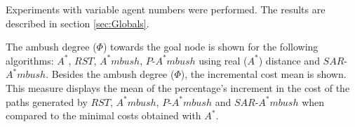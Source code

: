 Experiments with variable agent numbers were performed.
The results are described in section \ref{sec:Globals}. 

The ambush degree ($\Phi$) towards the goal node is shown for the 
following algorithms: $A^*$, $RST$, $A^*mbush$, $P$-$A^*mbush$ 
using real ($A^*$) distance and $SAR$-$A^*mbush$.
Besides the ambush degree ($\Phi$), the incremental cost mean is 
shown. This measure displays the mean of  the percentage's increment
in the cost of the paths generated by $RST$, $A^*mbush$,
$P$-$A^*mbush$ and $SAR$-$A^*mbush$ when compared to the minimal
costs obtained with $A^*$.

